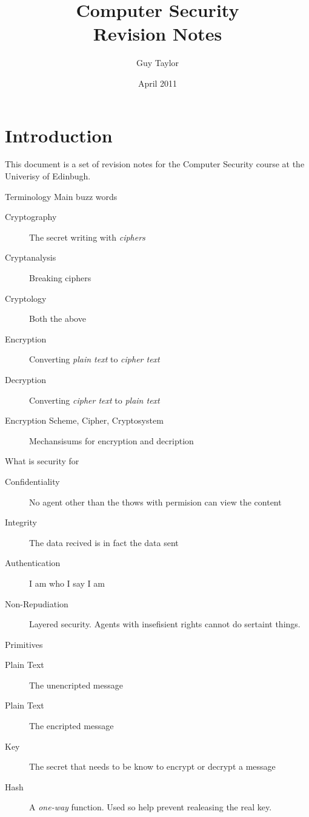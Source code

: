 \documentclass[11pt,twoside,a4paper]{article}
\begin{document}
  
  \title{Computer Security \\Revision Notes}
  \author{Guy Taylor}
  \date{April 2011}
  
  \maketitle
  
  \tableofcontents
  
  \section{Introduction}
    This document is a set of revision notes for the Computer Security \cite{cs_home} course at the Univerisy of Edinbugh.
  
  \clearpage
  
  \begin{section}{Terminology}
    Main buzz words
    \begin{description}
      \item[Cryptography] The secret writing with \emph{ciphers}
      \item[Cryptanalysis] Breaking ciphers
      \item[Cryptology] Both the above
      \item[Encryption] Converting \emph{plain text} to \emph{cipher text}
      \item[Decryption] Converting \emph{cipher text} to \emph{plain text}
      \item[Encryption Scheme, Cipher, Cryptosystem] Mechansisums for encryption and decription
    \end{description}
    
    What is security for
    \begin{description}
      \item[Confidentiality] No agent other than the thows with permision can view the content
      \item[Integrity] The data recived is in fact the data sent
      \item[Authentication] I am who I say I am
      \item[Non-Repudiation] Layered security. Agents with insefisient rights cannot do sertaint things.
    \end{description}
    
    
    Primitives
    \begin{description}
      \item[Plain Text] The unencripted message
      \item[Plain Text] The encripted message
      \item[Key] The secret that needs to be know to encrypt or decrypt a message
      \item[Hash] A \emph{one-way} function. Used so help prevent realeasing the real key.
    \end{description}
    
  \end{section}
  
\end{document}

